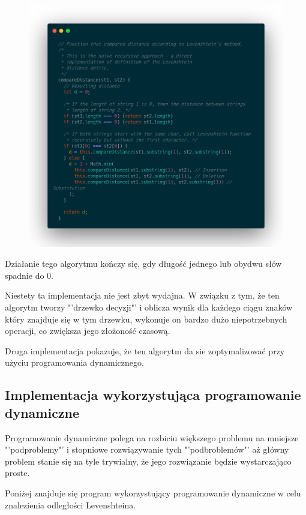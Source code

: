 \documentclass[a4paper,12pt]{article}
\begin{document}
\begin{figure}[h]
    \includegraphics[scale=0.25]{recursive.png}
\end{figure}

Działanie tego algorytmu kończy się, gdy długość
jednego lub obydwu słów spadnie do 0. \cite{jlordiales::edit}

Niestety ta implementacja nie jest zbyt wydajna.
W związku z tym, że ten algorytm tworzy "'drzewko decyzji"' i
oblicza wynik dla każdego ciągu znaków który znajduje się w
tym drzewku, wykonuje on bardzo dużo niepotrzebnych operacji, co
zwiększa jego złożoność czasową.

Druga implementacja pokazuje, że ten algorytm da sie zoptymalizować
przy użyciu programowania dynamicznego.

\subsection{Implementacja wykorzystująca programowanie dynamiczne}
Programowanie dynamiczne polega na rozbiciu
większego problemu na mniejsze "'podproblemy"' i
stopniowe rozwiązywanie tych "'podbroblemów"'
aż główny problem stanie się na tyle trywialny, że jego rozwiązanie
będzie wystarczająco proste.

Poniżej znajduje się program wykorzystujący programowanie
dynamiczne w celu znalezienia odległości Levenshteina.
\end{document}
